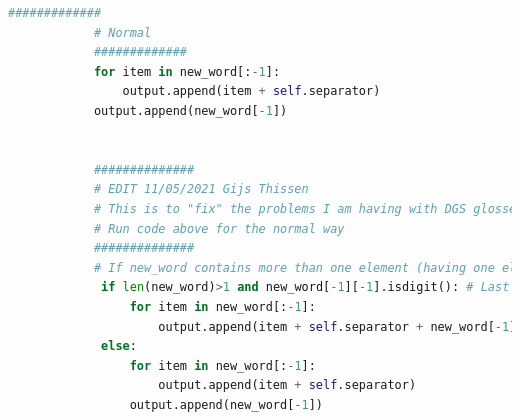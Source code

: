  \label{apx:bpemod}
\begin{lstlisting}[language=Python, caption=Shown is the Python code that is a modification to the normal Byte Pair Encoding algorithm. \cite{gijsgithub}]
            #############
            # Normal
            #############
            for item in new_word[:-1]:
                output.append(item + self.separator)
            output.append(new_word[-1])


            ##############
            # EDIT 11/05/2021 Gijs Thissen
            # This is to "fix" the problems I am having with DGS glosses with features that get split up
            # Run code above for the normal way
            ##############
            # If new_word contains more than one element (having one element suggest there not being a temporal feature)
             if len(new_word)>1 and new_word[-1][-1].isdigit(): # Last element of last element of new_word is digit
                 for item in new_word[:-1]:
                     output.append(item + self.separator + new_word[-1])
             else:
                 for item in new_word[:-1]:
                     output.append(item + self.separator)
                 output.append(new_word[-1])
\end{lstlisting}